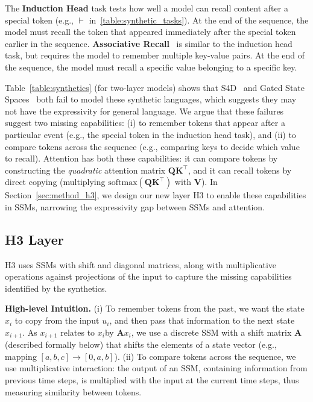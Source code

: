 The \textbf{Induction Head} task tests how well a model can recall content after a special token (e.g., $\vdash$ in~\ref{table:synthetic_tasks}).
At the end of the sequence, the model must recall the token that appeared immediately after the special token earlier in the sequence. \textbf{Associative Recall}~\citep{ba2016using} is similar to the induction head task, but requires the model to remember multiple key-value pairs. At the end of the sequence, the model must recall a specific value belonging to a specific key.

Table~\ref{table:synthetics} (for two-layer models) shows that S4D~\citep{gu2022parameterization} and Gated State Spaces~\citep{mehta2022long} both fail to model these synthetic languages, which suggests they may not have the expressivity for general language. We argue that these failures suggest two missing capabilities: (i) to remember tokens that appear after a particular event (e.g., the special token in the induction head task), and (ii) to compare tokens across the sequence (e.g., comparing keys to decide which value to recall). Attention has both these capabilities: it can compare tokens by constructing the \textit{quadratic} attention matrix $\mathbf{Q} \mathbf{K}^\top$, and it can recall tokens by direct copying (multiplying $\mathrm{softmax}(\mathbf{Q} \mathbf{K}^\top)$ with $\mathbf{V}$).
In Section~\ref{sec:method_h3}, we design our new layer \textsc{H3} to enable these capabilities in SSMs, narrowing the expressivity gap between SSMs and attention.

\subsection{\textsc{H3} Layer\label{sec:method_h3}}
\textsc{H3} uses SSMs with shift and diagonal matrices, along with multiplicative operations against projections of the input to capture the missing capabilities identified by the synthetics.

\textbf{High-level Intuition.} (i) To remember tokens from the past, we want the state $x_i$ to copy from the input $u_i$, and then pass that information to the next state $x_{i+1}$. As $x_{i+1}$ relates to $x_i$by $\mathbf{A} x_i$, we use a discrete SSM with a shift matrix $\mathbf{A}$ (described formally below) that shifts the elements of a state vector (e.g., mapping $[a, b, c] \to [0, a, b]$). (ii) To compare tokens across the sequence, we use multiplicative interaction: the output of an SSM, containing information from previous time steps, is multiplied with the input at the current time steps, thus measuring similarity between tokens.

